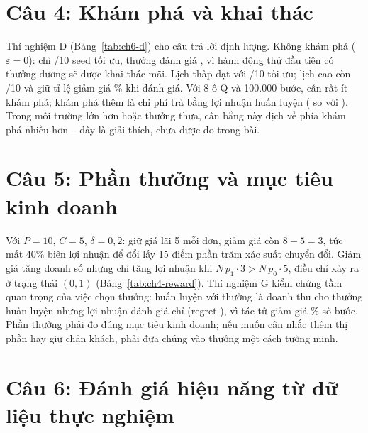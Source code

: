 \section{Câu 4: Khám phá và khai thác}

Thí nghiệm D (Bảng~\ref{tab:ch6-d}) cho câu trả lời định lượng. Không khám phá ($\varepsilon=0$): chỉ /10 seed tối ưu, thưởng đánh giá , vì hành động thử đầu tiên có thưởng dương sẽ được khai thác mãi. Lịch thấp đạt  với /10 tối ưu; lịch cao còn /10 và giữ tỉ lệ giảm giá \% khi đánh giá. Với 8 ô Q và 100.000 bước, cần rất ít khám phá; khám phá thêm là chi phí trả bằng lợi nhuận huấn luyện ( so với ). Trong môi trường lớn hơn hoặc thưởng thưa, cân bằng này dịch về phía khám phá nhiều hơn -- đây là giải thích, chưa được đo trong bài.

\section{Câu 5: Phần thưởng và mục tiêu kinh doanh}

Với $P=10$, $C=5$, $\delta=0{,}2$: giữ giá lãi 5 mỗi đơn, giảm giá còn $8-5=3$, tức mất 40\% biên lợi nhuận để đổi lấy 15 điểm phần trăm xác suất chuyển đổi. Giảm giá tăng doanh số nhưng chỉ tăng lợi nhuận khi $N\,p_1\cdot 3 > N\,p_0\cdot 5$, điều chỉ xảy ra ở trạng thái $(0,1)$ (Bảng~\ref{tab:ch4-reward}). Thí nghiệm G kiểm chứng tầm quan trọng của việc chọn thưởng: huấn luyện với thưởng là doanh thu cho thưởng huấn luyện  nhưng lợi nhuận đánh giá chỉ  (regret ), vì tác tử giảm giá \% số bước. Phần thưởng phải đo đúng mục tiêu kinh doanh; nếu muốn cân nhắc thêm thị phần hay giữ chân khách, phải đưa chúng vào thưởng một cách tường minh.

\section{Câu 6: Đánh giá hiệu năng từ dữ liệu thực nghiệm}

